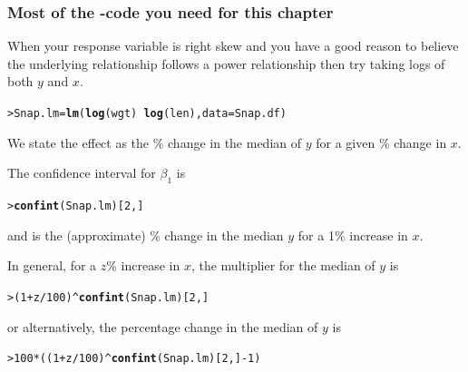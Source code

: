\documentclass{beamer}\usepackage[]{graphicx}\usepackage[]{xcolor}
\makeatletter
\newcommand{\hlnum}[1]{\textcolor[rgb]{0.686,0.059,0.569}{#1}}%
\newcommand{\hlopt}[1]{\textcolor[rgb]{0,0,0}{#1}}%
\newcommand{\hlstd}[1]{\textcolor[rgb]{0.345,0.345,0.345}{#1}}%
\newcommand{\hlkwb}[1]{\textcolor[rgb]{0.69,0.353,0.396}{#1}}%
\newcommand{\hlkwc}[1]{\textcolor[rgb]{0.333,0.667,0.333}{#1}}%
\newcommand{\hlkwd}[1]{\textcolor[rgb]{0.737,0.353,0.396}{\textbf{#1}}}%
\newenvironment{kframe}{%
 \def\at@end@of@kframe{}%
 \ifinner\ifhmode%
  \def\at@end@of@kframe{\end{minipage}}%
  \begin{minipage}{\columnwidth}%
 \fi\fi%
 \def\FrameCommand##1{\hskip\@totalleftmargin \hskip-\fboxsep
 \colorbox{shadecolor}{##1}\hskip-\fboxsep
     \hskip-\linewidth \hskip-\@totalleftmargin \hskip\columnwidth}%
 \MakeFramed {\advance\hsize-\width
   \@totalleftmargin\z@ \linewidth\hsize
   \@setminipage}}%
 {\par\unskip\endMakeFramed%
 \at@end@of@kframe}
\newenvironment{knitrout}{}{} %
\makeatother
\begin{document}
\begin{frame}[fragile]
\frametitle{Most of the -code you need for this chapter}

When your response variable is right skew and you have a good reason to believe the underlying relationship follows a power relationship then try taking logs of both $y$ and $x$.

\begin{knitrout}\scriptsize
{}\color{fgcolor}\begin{kframe}
\begin{alltt}
\hlstd{> }\hlstd{Snap.lm}\hlkwb{=}\hlkwd{lm}\hlstd{(}\hlkwd{log}\hlstd{(wgt)}\hlopt{~}\hlkwd{log}\hlstd{(len),}\hlkwc{data}\hlstd{=Snap.df)}
\end{alltt}
\end{kframe}
\end{knitrout}
\medskip

We state the effect as the \% change in the median of $y$ for a given \% change in $x$.
\bigskip

The confidence interval for $\beta_1$ is 
\begin{knitrout}\scriptsize
{}\color{fgcolor}\begin{kframe}
\begin{alltt}
\hlstd{> }\hlkwd{confint}\hlstd{(Snap.lm)[}\hlnum{2}\hlstd{,]}
\end{alltt}
\end{kframe}
\end{knitrout}
and is the (approximate) \% change in the median $y$ for a 1\% increase in $x$.
\medskip

In general, for a $z$\% increase in $x$, the multiplier for the median of $y$ is
\begin{knitrout}\scriptsize
{}\color{fgcolor}\begin{kframe}
\begin{alltt}
\hlstd{> }\hlstd{(}\hlnum{1}\hlopt{+}\hlstd{z}\hlopt{/}\hlnum{100}\hlstd{)}\hlopt{^}\hlkwd{confint}\hlstd{(Snap.lm)[}\hlnum{2}\hlstd{,]}
\end{alltt}
\end{kframe}
\end{knitrout}
or alternatively, the percentage change in the median of $y$ is
\begin{knitrout}\scriptsize
{}\color{fgcolor}\begin{kframe}
\begin{alltt}
\hlstd{> }\hlnum{100}\hlopt{*}\hlstd{((}\hlnum{1}\hlopt{+}\hlstd{z}\hlopt{/}\hlnum{100}\hlstd{)}\hlopt{^}\hlkwd{confint}\hlstd{(Snap.lm)[}\hlnum{2}\hlstd{,]}\hlopt{-}\hlnum{1}\hlstd{)}
\end{alltt}
\end{kframe}
\end{knitrout}

\end{frame}
\end{document}
